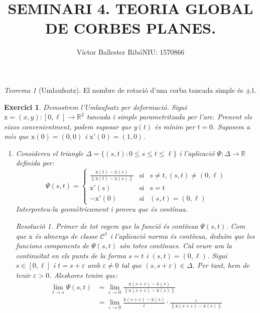 \documentclass[10pt,a4paper]{article}
\title{\bfseries\large SEMINARI 4. TEORIA GLOBAL DE CORBES PLANES.}
\author{Víctor Ballester Ribó\endgraf NIU: 1570866}
\date{\parbox{\linewidth}{\centering
  Geometria diferencial\endgraf
  Grau en Matemàtiques\endgraf
  Universitat Autònoma de Barcelona\endgraf
  Març de 2022}}
\newcommand{\vf}[1]{\boldsymbol{\mathrm{#1}}} %
\newcommand{\RR}{\ensuremath{\mathbb{R}}}
\newtheorem{exercice}{Exercici}
\theoremstyle{remark}
\newtheorem*{resolution}{Resolució}
\theoremstyle{math}
\newtheorem{theorem}{Teorema}
\begin{document}
\maketitle
\begin{theorem}[Umlaufsatz]
  El nombre de rotació d'una corba tancada simple és $\pm 1$.
\end{theorem}
\setcounter{exercice}{5}
\begin{exercice}
  Demostrem l'Umlaufsatz per deformació. Sigui $\vf{x}=(x,y):[0,\ell]\rightarrow\RR^2$ tancada i simple parametritzada per l'arc. Prenent els eixos convenientment, podem suposar que $y(t)$ és mínim per $t= 0$. Suposem a més que $\vf{x}(0) = (0,0)$ i $\vf{x}'(0) = (1,0)$.
  \begin{enumerate}
    \item Considereu el triangle $\Delta=\{(s,t):0\leq s\leq t\leq \ell\}$ i l'aplicació $\Psi:\Delta\rightarrow\RR$ definida per:
          $$\Psi(s,t)=\left\{
            \begin{array}{lcl}
              \frac{\vf{x}(t)-\vf{x}(s)}{\|\vf{x}(t)-\vf{x}(s)\|} & \text{si} & s\ne t,(s,t)\ne (0,\ell) \\
              \vf{x}'(s)                                          & \text{si} & s=t                      \\
              -\vf{x}'(0)                                         & \text{si} & (s,t)=(0,\ell)
            \end{array}
            \right.$$
          Interpreteu-la geomètricament i proveu que és contínua.
          \begin{resolution}
            Primer de tot vegem que la funció és contínua $\Psi(s,t)$. Com que $\vf{x}$ és almenys de classe $\mathcal{C}^1$ i l'aplicació norma és contínua, deduïm que les funcions components de $\Psi(s,t)$ són totes contínues. Cal veure ara la continuïtat en els punts de la forma $s=t$ i $(s,t)=(0,\ell)$.
            Sigui $s\in [0,\ell]$ i $t=s+\varepsilon$ amb $\varepsilon\ne 0$ tal que $(s,s+\varepsilon)\in\Delta$. Per tant, hem de tenir $\varepsilon>0$. Aleshores tenim que:
            \begin{align*}
              \lim_{t\to s}\Psi(s,t) & =\lim_{\varepsilon\to 0}\frac{\vf{x}(s+\varepsilon)-\vf{x}(s)}{\|\vf{x}(s+\varepsilon)-\vf{x}(s)\|}                                                                                 \\
                                     & =\lim_{\varepsilon\to 0}\frac{\vf{x}(s+\varepsilon)-\vf{x}(s)}{\varepsilon}\cdot\frac{\varepsilon}{\|\vf{x}(s+\varepsilon)-\vf{x}(s)\|}                                             \\

\end{align*}
\end{resolution}
\end{enumerate}
\end{exercice}
\end{document}
